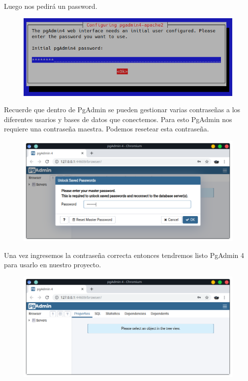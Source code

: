 \documentclass{article}
\begin{document}
Luego nos pedirá un password.

\begin{figure}[h!]
  \centering
  \includegraphics[scale=0.5]{./Pictures/265_password.png}
\end{figure}

Recuerde que dentro de PgAdmin se pueden gestionar varias contraseñas a los
diferentes usarios y bases de datos que conectemos. Para esto PgAdmin nos
requiere una contraseña maestra. Podemos resetear esta contraseña.

\begin{figure}[h!]
  \centering
  \includegraphics[scale=0.5]{./Pictures/266_login_password.png}
\end{figure}

Una vez ingresemos la contraseña correcta entonces tendremos listo PgAdmin 4
para usarlo en nuestro proyecto.

\begin{figure}[h!]
  \centering
  \includegraphics[scale=0.5]{./Pictures/267_pgadmin4_running.png}
\end{figure}
\end{document}
